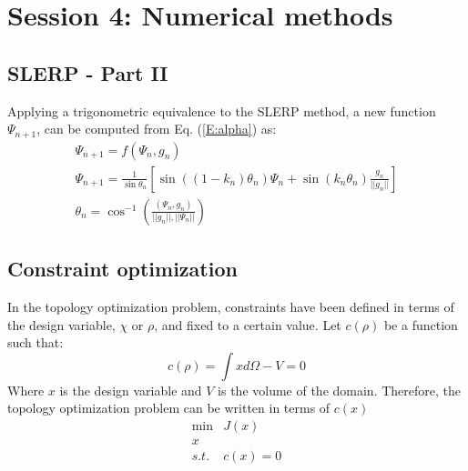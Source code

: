 \section{Session 4: Numerical methods}
\subsection{SLERP - Part II}
Applying a trigonometric equivalence to the SLERP method, a new function $\Psi_{n+1}$, can be computed from Eq. (\ref{E:alpha}) as:
\begin{equation}\label{E:slerp_theta}
	\begin{array}{c}
		\Psi_{n+1}=f(\Psi_{n}, g_n) \\
		\Psi_{n+1}=\frac{1}{\sin \theta_n}\left[\sin((1-k_n)\theta_n)\Psi_{n}+\sin(k_n\theta_n)\frac{g_n}{||g_n||}\right]\\
		\theta_n=\cos^{-1} \left(\frac{(\Psi_{n},g_n)}{||g_n||,||\Psi_{n}||}\right) 
	\end{array}
\end{equation}
\subsection{Constraint optimization}
In the topology optimization problem, constraints have been defined in terms of the design variable, $ \chi $ or $ \rho $, and fixed to a certain value. Let $ c(\rho) $ be a function such that:
\begin{equation}
c(\rho) =\int x d\Omega-V=0
\end{equation}
Where $x$ is the design variable and $ V $ is the volume of the domain. Therefore, the topology optimization problem can be written in terms of $ c(x) $
\begin{equation}
\begin{array}{cc}
\min &J(x)\\
x & \\
s.t. & c(x)=0\\
\end{array}
\end{equation}
